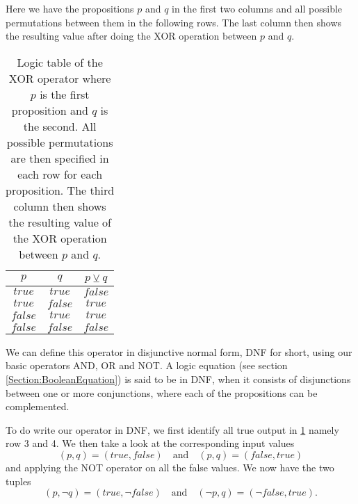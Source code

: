                 Here we have the propositions $p$ and $q$ in the first two columns and all possible permutations between them in the following rows. The last column then shows the resulting value after doing the XOR operation between $p$ and $q$.
                
                \begin{table}[h!]
                    \centering
                    \begin{tabular}{|c|c|c|}
                    	\hline
                    	  $p$   &   $q$   & $p \veebar q$ \\ \hline
                    	$true$  & $true$  &    $false$    \\ \hline
                    	$true$  & $false$ &    $true$     \\ \hline
                    	$false$ & $true$  &    $true$     \\ \hline
                    	$false$ & $false$ &    $false$    \\ \hline
                    \end{tabular}
                    \caption{Logic table of the XOR operator where $p$ is the first proposition and $q$ is the second. All possible permutations are then specified in each row for each proposition. The third column then shows the resulting value of the XOR operation between $p$ and $q$.}
                    \label{LogicTable:XOR}
                \end{table}
            
                We can define this operator in disjunctive normal form, DNF for short, using our basic operators AND, OR and NOT. A logic equation (see section \ref{Section:BooleanEquation}) is said to be in DNF, when it consists of disjunctions between one or more conjunctions, where each of the propositions can be complemented.
                
                To do write our operator in DNF, we first identify all true output in \ref{LogicTable:XOR} namely row 3 and 4. We then take a look at the corresponding input values
                \begin{equation}
                    (p,q) = (true, false) \quad \text{and} \quad (p,q) = (false, true)
                \end{equation}
                and applying the NOT operator on all the false values. We now have the two tuples
                \begin{equation}
                    (p,\neg q) = (true, \neg false) \quad \text{and} \quad (\neg p, q) = (\neg false, true).
                \end{equation}
                
